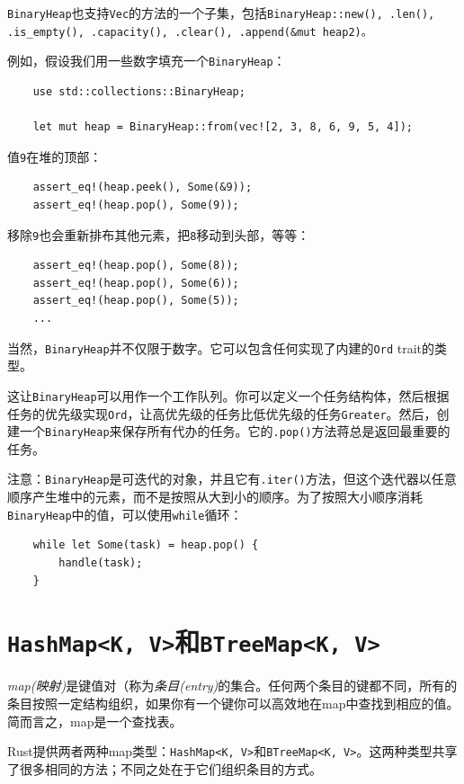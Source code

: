 \texttt{BinaryHeap}也支持\texttt{Vec}的方法的一个子集，包括\texttt{BinaryHeap::new(), .len(), .is\_empty(), .capacity(), .clear(), .append(\&mut heap2)。}

例如，假设我们用一些数字填充一个\texttt{BinaryHeap}：
\begin{verbatim}
    use std::collections::BinaryHeap;

    let mut heap = BinaryHeap::from(vec![2, 3, 8, 6, 9, 5, 4]);
\end{verbatim}

值\texttt{9}在堆的顶部：
\begin{verbatim}
    assert_eq!(heap.peek(), Some(&9));
    assert_eq!(heap.pop(), Some(9));
\end{verbatim}

移除\texttt{9}也会重新排布其他元素，把\texttt{8}移动到头部，等等：
\begin{verbatim}
    assert_eq!(heap.pop(), Some(8));
    assert_eq!(heap.pop(), Some(6));
    assert_eq!(heap.pop(), Some(5));
    ...
\end{verbatim}

当然，\texttt{BinaryHeap}并不仅限于数字。它可以包含任何实现了内建的\texttt{Ord} trait的类型。

这让\texttt{BinaryHeap}可以用作一个工作队列。你可以定义一个任务结构体，然后根据任务的优先级实现\texttt{Ord}，让高优先级的任务比低优先级的任务\texttt{Greater}。然后，创建一个\texttt{BinaryHeap}来保存所有代办的任务。它的\texttt{.pop()}方法蒋总是返回最重要的任务。

注意：\texttt{BinaryHeap}是可迭代的对象，并且它有\texttt{.iter()}方法，但这个迭代器以任意顺序产生堆中的元素，而不是按照从大到小的顺序。为了按照大小顺序消耗\texttt{BinaryHeap}中的值，可以使用\texttt{while}循环：
\begin{verbatim}
    while let Some(task) = heap.pop() {
        handle(task);
    }
\end{verbatim}

\section{\texttt{HashMap<K, V>}和\texttt{BTreeMap<K, V>}}

\emph{map(映射)}是键值对（称为\emph{条目(entry)}的集合。任何两个条目的键都不同，所有的条目按照一定结构组织，如果你有一个键你可以高效地在map中查找到相应的值。简而言之，map是一个查找表。

Rust提供两者两种map类型：\texttt{HashMap<K, V>}和\texttt{BTreeMap<K, V>}。这两种类型共享了很多相同的方法；不同之处在于它们组织条目的方式。

